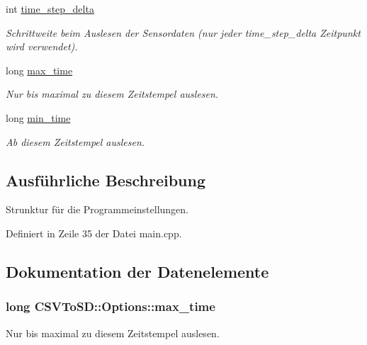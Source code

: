 \begin{DoxyCompactItemize}
int \hyperlink{structCSVToSD_1_1Options_a4bdb2207018549711acd7e6cbd61d082}{time\-\_\-step\-\_\-delta}
\begin{DoxyCompactList}\small\item\em Schrittweite beim Auslesen der Sensordaten (nur jeder time\-\_\-step\-\_\-delta Zeitpunkt wird verwendet). \end{DoxyCompactList}\item 
long \hyperlink{structCSVToSD_1_1Options_a1327c05fef5f8c704eefa1de0e9c763f}{max\-\_\-time}
\begin{DoxyCompactList}\small\item\em Nur bis maximal zu diesem Zeitstempel auslesen. \end{DoxyCompactList}\item 
long \hyperlink{structCSVToSD_1_1Options_a65261b994c8180995c6f95c44f863c20}{min\-\_\-time}
\begin{DoxyCompactList}\small\item\em Ab diesem Zeitstempel auslesen. \end{DoxyCompactList}\end{DoxyCompactItemize}


\subsection{Ausführliche Beschreibung}
Strunktur für die Programmeinstellungen. 

Definiert in Zeile 35 der Datei main.\-cpp.



\subsection{Dokumentation der Datenelemente}
\hypertarget{structCSVToSD_1_1Options_a1327c05fef5f8c704eefa1de0e9c763f}{
\subsubsection[{max\-\_\-time}]{\setlength{\rightskip}{0pt plus 5cm}long C\-S\-V\-To\-S\-D\-::\-Options\-::max\-\_\-time}}\label{structCSVToSD_1_1Options_a1327c05fef5f8c704eefa1de0e9c763f}


Nur bis maximal zu diesem Zeitstempel auslesen. 



